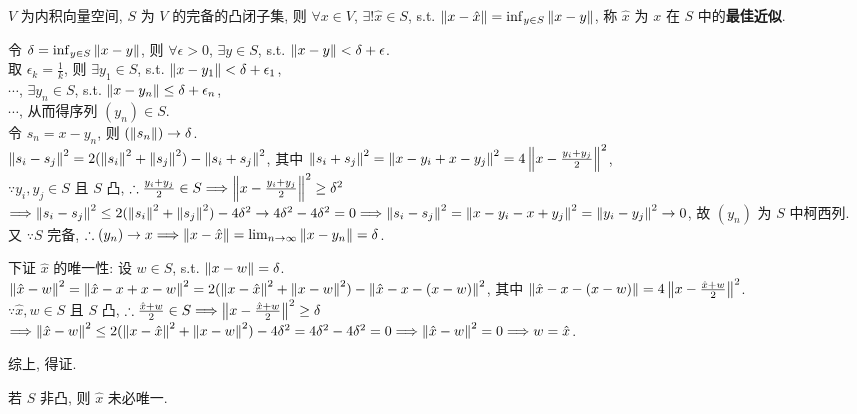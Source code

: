 \documentclass{note}
\begin{document}
\begin{thm}[(课本定理 13.9)]\label{thm-13.9}
    $V$ 为内积向量空间, $S$ 为 $V$ 的完备的凸闭子集, 则 $\forall x\in V$, $\exists!\hat{x}\in S$, s.t. $\left\lVert x-\hat{x}\right\rVert=\inf_{y\in S}\left\lVert x-y\right\rVert$, 称 $\hat{x}$ 为 $x$ 在 $S$ 中的\textbf{最佳近似}.
\end{thm}
\begin{pf}
    令 $\delta=\inf_{y\in S}\left\lVert x-y\right\rVert$, 则 $\forall\epsilon>0$, $\exists y\in S$, s.t. $\left\lVert x-y\right\rVert<\delta+\epsilon$.\\
    取 $\epsilon_k=\frac{1}{k}$, 则 $\exists y_1\in S$, s.t. $\left\lVert x-y_1\right\rVert<\delta+\epsilon_1$,\\
    $\cdots$, $\exists y_n\in S$, s.t. $\left\lVert x-y_n\right\rVert\leq\delta+\epsilon_n$,\\
    $\cdots$, 从而得序列 $(y_n)\in S$.\\
    令 $s_n=x-y_n$, 则 $(\left\lVert s_n\right\rVert)\rightarrow\delta$.\\
    $\left\lVert s_i-s_j\right\rVert^2=2(\left\lVert s_i\right\rVert^2+\left\lVert s_j\right\rVert^2)-\left\lVert s_i+s_j\right\rVert^2$, 其中 $\left\lVert s_i+s_j\right\rVert^2=\left\lVert x-y_i+x-y_j\right\rVert^2=4\left\lVert x-\frac{y_i+y_j}{2}\right\rVert^2$,\\
    $\because y_i,y_j\in S$ 且 $S$ 凸, $\therefore\frac{y_i+y_j}{2}\in S\Longrightarrow\left\lVert x-\frac{y_i+y_j}{2}\right\rVert^2\geq\delta^2$\\
    $\Longrightarrow\left\lVert s_i-s_j\right\rVert^2\leq 2(\left\lVert s_i\right\rVert^2+\left\lVert s_j\right\rVert^2)-4\delta^2\rightarrow 4\delta^2-4\delta^2=0\Longrightarrow\left\lVert s_i-s_j\right\rVert^2=\left\lVert x-y_i-x+y_j\right\rVert^2=\left\lVert y_i-y_j\right\rVert^2\rightarrow 0$, 故 $(y_n)$ 为 $S$ 中柯西列.\\
    又 $\because S$ 完备, $\therefore(y_n)\rightarrow x\Longrightarrow\left\lVert x-\hat{x}\right\rVert=\lim_{n\rightarrow\infty}\left\lVert x-y_n\right\rVert=\delta$.

    下证 $\hat{x}$ 的唯一性: 设 $w\in S$, s.t. $\left\lVert x-w\right\rVert=\delta$.\\
    $\left\lVert\hat{x}-w\right\rVert^2=\left\lVert\hat{x}-x+x-w\right\rVert^2=2(\left\lVert x-\hat{x}\right\rVert^2+\left\lVert x-w\right\rVert^2)-\left\lVert\hat{x}-x-(x-w)\right\rVert^2$, 其中 $\left\lVert\hat{x}-x-(x-w)\right\rVert=4\left\lVert x-\frac{\hat{x}+w}{2}\right\rVert^2$.\\
    $\because\hat{x},w\in S$ 且 $S$ 凸, $\therefore\frac{\hat{x}+w}{2}\in S\Longrightarrow\left\lVert x-\frac{\hat{x}+w}{2}\right\rVert^2\geq\delta$\\
    $\Longrightarrow\left\lVert\hat{x}-w\right\rVert^2\leq 2(\left\lVert x-\hat{x}\right\rVert^2+\left\lVert x-w\right\rVert^2)-4\delta^2=4\delta^2-4\delta^2=0\Longrightarrow\left\lVert\hat{x}-w\right\rVert^2=0\Longrightarrow w=\hat{x}$.

    综上, 得证.
\end{pf}

若 $S$ 非凸, 则 $\hat{x}$ 未必唯一.
\end{document}
